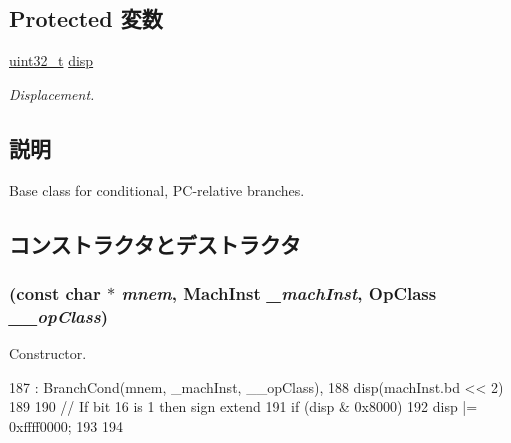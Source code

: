 \subsection*{Protected 変数}
\begin{DoxyCompactItemize}
\item 
\hyperlink{Type_8hh_a435d1572bf3f880d55459d9805097f62}{uint32\_\-t} \hyperlink{classPowerISA_1_1BranchPCRelCond_a0c5598bcc641a0989f32ce0b0ea29bb3}{disp}
\begin{DoxyCompactList}\small\item\em Displacement. \item\end{DoxyCompactList}\end{DoxyCompactItemize}


\subsection{説明}
Base class for conditional, PC-\/relative branches. 

\subsection{コンストラクタとデストラクタ}
\hypertarget{classPowerISA_1_1BranchPCRelCond_ae2724f428c54f73fe949436577878bb2}{
\subsubsection[{BranchPCRelCond}]{ (const char $\ast$ {\em mnem}, \/  {\bf MachInst} {\em \_\-machInst}, \/  OpClass {\em \_\-\_\-opClass})}}
\label{classPowerISA_1_1BranchPCRelCond_ae2724f428c54f73fe949436577878bb2}


Constructor. 


\begin{DoxyCode}
187         : BranchCond(mnem, _machInst, __opClass),
188           disp(machInst.bd << 2)
189     {
190         // If bit 16 is 1 then sign extend
191         if (disp & 0x8000) {
192             disp |= 0xffff0000;
193         }
194     }
\end{DoxyCode}


